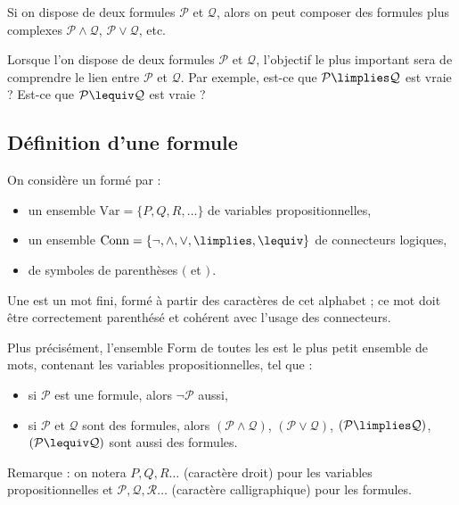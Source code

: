 \documentclass[11pt,class=report,crop=false]{standalone}
\begin{document}
Si on dispose de deux formules $\mathcal{P}$ et $\mathcal{Q}$, alors on peut composer des formules plus complexes $\mathcal{P} \land \mathcal{Q}$, $\mathcal{P} \lor \mathcal{Q}$, etc.

Lorsque l'on dispose de deux formules $\mathcal{P}$ et $\mathcal{Q}$, l'objectif le plus important sera de comprendre le lien entre $\mathcal{P}$ et $\mathcal{Q}$. Par exemple, est-ce que $\mathcal{P} \limplies \mathcal{Q}$ est vraie ? Est-ce que $\mathcal{P} \lequiv \mathcal{Q}$ est vraie ?


\subsection{Définition d'une formule}

On considère un  formé par :
\begin{itemize}
	\item un ensemble $\text{Var} = \{P, Q, R,\ldots\}$ de variables propositionnelles,
	
	\item un ensemble $\text{Conn} = \{ \lnot, \land, \lor, \limplies, \lequiv \}$ de connecteurs logiques,
	
	\item de symboles de parenthèses $($ et $)$\,.
\end{itemize}

Une  est un mot fini, formé à partir des caractères de cet alphabet ; ce mot doit être correctement parenthésé et cohérent avec l'usage des connecteurs.

\begin{definition}
Plus précisément, l'ensemble $\text{Form}$ de toutes les  est le plus petit ensemble de mots, contenant les variables propositionnelles, tel que :
\begin{itemize}
	\item si $\mathcal{P}$ est une formule, alors $\lnot \mathcal{P}$ aussi,
	\item si $\mathcal{P}$ et $\mathcal{Q}$ sont des formules, alors 
	$(\mathcal{P} \land \mathcal{Q})$, 
	$(\mathcal{P} \lor \mathcal{Q})$, 
	$(\mathcal{P} \limplies \mathcal{Q})$, 
	$(\mathcal{P} \lequiv \mathcal{Q})$ sont aussi des formules.
\end{itemize}
\end{definition}

Remarque : on notera $P, Q, R\ldots$ (caractère droit) pour les variables propositionnelles et 
$\mathcal{P}, \mathcal{Q}, \mathcal{R}\ldots$ (caractère calligraphique) pour les formules.
\end{document}
